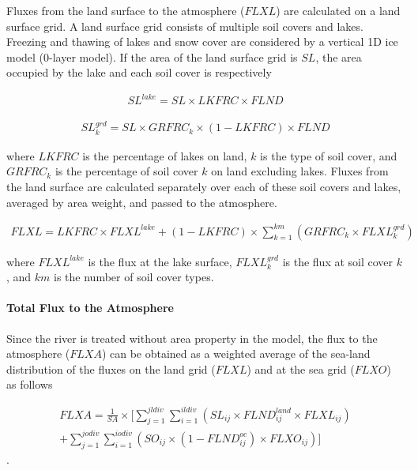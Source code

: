 Fluxes from the land surface to the atmosphere (\(FLXL\)) are calculated
on a land surface grid. A land surface grid consists of multiple soil
covers and lakes. Freezing and thawing of lakes and snow cover are
considered by a vertical 1D ice model (0-layer model). If the area of
the land surface grid is \(SL\), the area occupied by the lake and each
soil cover is respectively

\begin{eqnarray} SL^{lake}=SL  \times  LKFRC \times FLND \end{eqnarray}

\begin{eqnarray} SL^{grd}_k = SL \times GRFRC_k \times (1-LKFRC) \times FLND \end{eqnarray}

where \(LKFRC\) is the percentage of lakes on land, \(k\) is the type of
soil cover, and \(GRFRC_k\) is the percentage of soil cover \(k\) on
land excluding lakes. Fluxes from the land surface are calculated
separately over each of these soil covers and lakes, averaged by area
weight, and passed to the atmosphere.

\begin{eqnarray} FLXL = LKFRC \times FLXL^{lake} + (1-LKFRC) \times \sum_{k=1}^{km} (GRFRC_k \times FLXL_k^{grd}) \end{eqnarray}

where \(FLXL^{lake}\) is the flux at the lake surface,
\(FLXL_{k}^{grd}\) is the flux at soil cover \(k\), and \(km\) is the
number of soil cover types.

\hypertarget{total-flux-to-the-atmosphere}{%
\paragraph{Total Flux to the
Atmosphere}\label{total-flux-to-the-atmosphere}}

Since the river is treated without area property in the model, the flux
to the atmosphere (\(FLXA\)) can be obtained as a weighted average of
the sea-land distribution of the fluxes on the land grid (\(FLXL\)) and
at the sea grid (\(FLXO\)) as follows

\begin{eqnarray} FLXA = \frac{1}{SA} \times [ \sum _ {j=1}^{jldiv} \sum_{i=1}^{ildiv}(SL _ {ij} \times FLND^{land} _ {ij} \times FLXL_{ij}) \\ + \sum _ {j=1}^{jodiv}\sum _ {i=1}^{iodiv }(SO _ {ij} \times (1-FLND^{oc} _ {ij}) \times FLXO _ {ij})] \end{eqnarray}.

